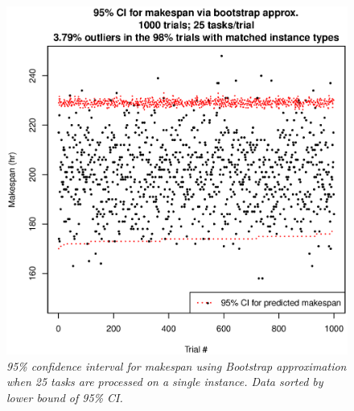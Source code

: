 \documentclass[12pt]{report}
\begin{document}
\begin{figure}
\includegraphics[width=1\textwidth]{validate-stochastic-runtimes-1000-trials-25-tasks.eps}
\caption{\textit{95\% confidence interval for makespan using Bootstrap approximation when 25 tasks are processed on a single instance. Data sorted by lower bound of 95\% CI.}}
\label{fig:validate-stochastic-runtimes-1000-trials-25-tasks}
\end{figure}
\end{document}
